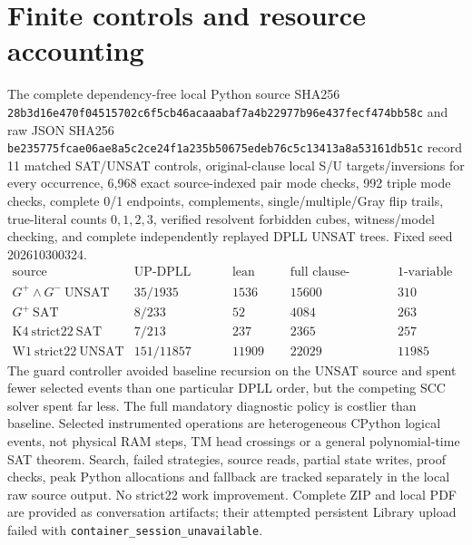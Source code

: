 \documentclass[10pt]{article}
\begin{document}
\section{Finite controls and resource accounting}
The complete dependency-free local Python source
SHA256 \texttt{28b3d16e470f04515702c6f5cb46acaaabaf7a4b22977b96e437fecf474bb58c}
and raw JSON SHA256
\texttt{be235775fcae06ae8a5c2ce24f1a235b50675edeb76c5c13413a8a53161db51c}
record 11 matched SAT/UNSAT controls, original-clause local
S/U targets/inversions for every occurrence,
6,968 exact source-indexed pair mode checks,
992 triple mode checks, complete 0/1 endpoints,
complements, single/multiple/Gray flip trails, true-literal
counts $0,1,2,3$, verified resolvent forbidden cubes,
witness/model checking, and complete independently replayed
DPLL UNSAT trees. Fixed seed 202610300324.
\[
\begin{array}{lrrrr}
\text{source}&\text{UP-DPLL nodes/work}&\text{lean anchor}&
\text{full clause-extreme diagnostic}&\text{1-variable 2SAT}\\
\hline
G^+\land G^-~\mathrm{UNSAT}&35/1935&1536&15600&310\\
G^+~\mathrm{SAT}&8/233&52&4084&263\\
\mathrm{K4~strict22~SAT}&7/213&237&2365&257\\
\mathrm{W1~strict22~UNSAT}&151/11857&11909&22029&11985
\end{array}
\]
The guard controller avoided baseline recursion on the UNSAT
source and spent fewer selected events than one particular
DPLL order, but the competing SCC solver spent far less.
The full mandatory diagnostic policy is costlier than baseline.
Selected instrumented operations are heterogeneous CPython
logical events, not physical RAM steps, TM head crossings
or a general polynomial-time SAT theorem. Search, failed
strategies, source reads, partial state writes, proof checks,
peak Python allocations and fallback are tracked separately
in the local raw source output. No strict22 work improvement.
Complete ZIP and local PDF are provided as conversation artifacts;
their attempted persistent Library upload failed with
\texttt{container\_session\_unavailable}.
\end{document}
